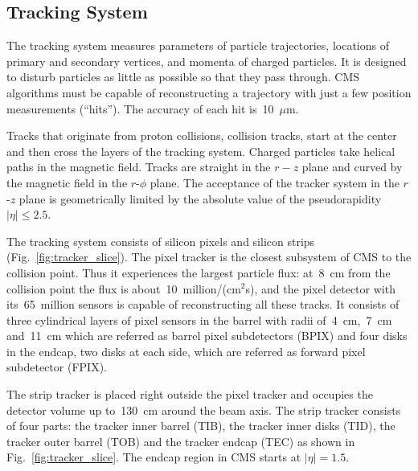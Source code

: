 \subsection{Tracking System}

The tracking system measures parameters of particle trajectories, locations of primary and secondary vertices, and momenta of charged particles. It is designed to disturb particles as little as possible so that they pass through. CMS algorithms must be capable of reconstructing a trajectory with just a few position measurements (``hits''). The accuracy of each hit is~10~$\mu$m.

Tracks that originate from proton collisions, collision tracks, start at the center and then cross the layers of the tracking system. Charged particles take helical paths in the magnetic field. Tracks are straight in the $r-z$ plane and curved by the magnetic field in the $r$-$\phi$ plane. The acceptance of the tracker system in the $r$-$z$ plane is geometrically limited by the absolute value of the pseudorapidity $|\eta| \leq 2.5$.

The tracking system consists of silicon pixels and silicon strips (Fig.~\ref{fig:tracker_slice}). The pixel tracker is the closest subsystem of CMS to the collision point. Thus it experiences the largest particle flux: at~8~cm from the collision point the flux is about~10~million/(cm$^2$s), and the pixel detector with its~65~million sensors is capable of reconstructing all these tracks. It consists of three cylindrical layers of pixel sensors in the barrel with radii of~4~cm,~7~cm and~11~cm which are referred as barrel pixel subdetectors (BPIX) and four disks in the endcap, two disks at each side, which are referred as forward pixel subdetector (FPIX). 


The strip tracker is placed right outside the pixel tracker and occupies the detector volume up to~130~cm around the beam axis. The strip tracker consists of four parts: the tracker inner barrel (TIB), the tracker inner disks (TID), the tracker outer barrel (TOB) and the tracker endcap (TEC) as shown in Fig.~\ref{fig:tracker_slice}. The endcap region in CMS starts at $|\eta|=1.5$. %

